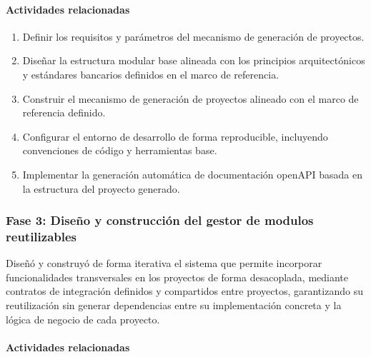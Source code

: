 \paragraph*{Actividades relacionadas}

\begin{enumerate}
    \item Definir los requisitos y parámetros del mecanismo de generación de proyectos.

    \item Diseñar la estructura modular base alineada con los principios arquitectónicos y estándares bancarios definidos en el marco de referencia.

    \item Construir el mecanismo de generación de proyectos alineado con el marco de referencia definido.

    \item Configurar el entorno de desarrollo de forma reproducible, incluyendo convenciones de código y herramientas base.

    \item Implementar la generación automática de documentación openAPI basada en la estructura del proyecto generado.
\end{enumerate}

\subsubsection*{Fase 3: Diseño y construcción del gestor de modulos reutilizables}

Diseñó y construyó de forma iterativa el sistema que permite incorporar funcionalidades transversales en los proyectos de forma desacoplada, mediante contratos de integración definidos y compartidos entre proyectos, garantizando su reutilización sin generar dependencias entre su implementación concreta y la lógica de negocio de cada proyecto.

\paragraph*{Actividades relacionadas}

